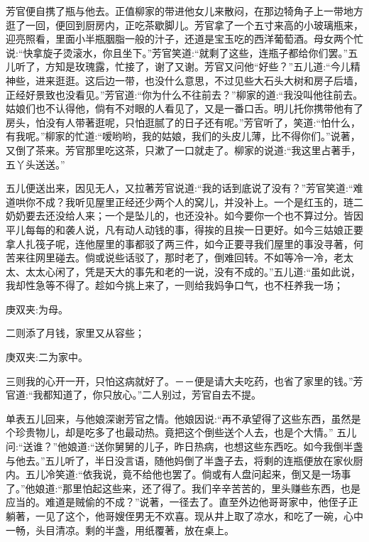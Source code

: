 \begin{parag}
    芳官便自携了瓶与他去。正值柳家的带进他女儿来散闷，在那边犄角子上一带地方逛了一回，便回到厨房内，正吃茶歇脚儿。芳官拿了一个五寸来高的小玻璃瓶来，迎亮照看，里面小半瓶胭脂一般的汁子，还道是宝玉吃的西洋葡萄酒。母女两个忙说:“快拿旋子烫滚水，你且坐下。”芳官笑道:“就剩了这些，连瓶子都给你们罢。”五儿听了，方知是玫瑰露，忙接了，谢了又谢。芳官又问他“好些？”五儿道:“今儿精神些，进来逛逛。这后边一带，也没什么意思，不过见些大石头大树和房子后墙，正经好景致也没看见。”芳官道:“你为什么不往前去？”柳家的道:“我没叫他往前去。姑娘们也不认得他，倘有不对眼的人看见了，又是一番口舌。明儿托你携带他有了房头，怕没有人带著逛呢，只怕逛腻了的日子还有呢。”芳官听了，笑道:“怕什么，有我呢。”柳家的忙道:“嗳哟哟，我的姑娘，我们的头皮儿薄，比不得你们。”说著，又倒了茶来。芳官那里吃这茶，只漱了一口就走了。柳家的说道:“我这里占著手，五丫头送送。”
\end{parag}


\begin{parag}
    五儿便送出来，因见无人，又拉著芳官说道:“我的话到底说了没有？”芳官笑道:“难道哄你不成？我听见屋里正经还少两个人的窝儿，并没补上。一个是红玉的，琏二奶奶要去还没给人来；一个是坠儿的，也还没补。如今要你一个也不算过分。皆因平儿每每的和袭人说，凡有动人动钱的事，得挨的且挨一日更好。如今三姑娘正要拿人扎筏子呢，连他屋里的事都驳了两三件，如今正要寻我们屋里的事没寻著，何苦来往网里碰去。倘或说些话驳了，那时老了，倒难回转。不如等冷一冷，老太太、太太心闲了，凭是天大的事先和老的一说，没有不成的。”五儿道:“虽如此说，我却性急等不得了。趁如今挑上来了，一则给我妈争口气，也不枉养我一场；\begin{note}庚双夹:为母。\end{note}二则添了月钱，家里又从容些；\begin{note}庚双夹:二为家中。\end{note}三则我的心开一开，只怕这病就好了。－－便是请大夫吃药，也省了家里的钱。”芳官道:“我都知道了，你只放心。”二人别过，芳官自去不提。
\end{parag}


\begin{parag}
    单表五儿回来，与他娘深谢芳官之情。他娘因说:“再不承望得了这些东西，虽然是个珍贵物儿，却是吃多了也最动热。竟把这个倒些送个人去，也是个大情。” 五儿问:“送谁？”他娘道:“送你舅舅的儿子，昨日热病，也想这些东西吃。如今我倒半盏与他去。”五儿听了，半日没言语，随他妈倒了半盏子去，将剩的连瓶便放在家伙厨内。五儿冷笑道:“依我说，竟不给他也罢了。倘或有人盘问起来，倒又是一场事了。”他娘道:“那里怕起这些来，还了得了。我们辛辛苦苦的，里头赚些东西，也是应当的。难道是贼偷的不成？”说著，一径去了。直至外边他哥哥家中，他侄子正躺著，一见了这个，他哥嫂侄男无不欢喜。现从井上取了凉水，和吃了一碗，心中一畅，头目清凉。剩的半盏，用纸覆著，放在桌上。
\end{parag}


